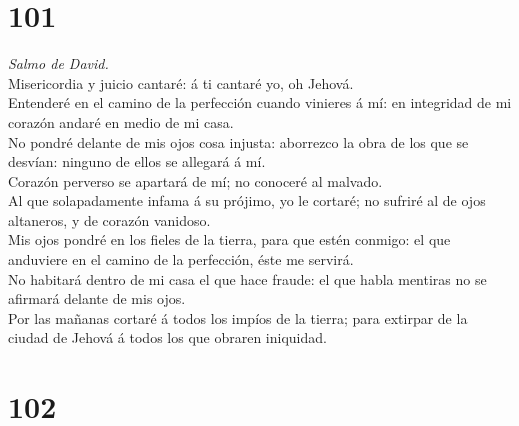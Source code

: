 \hypertarget{section-100}{%
\section{101}\label{section-100}}

 \emph{Salmo de David.}\\
Misericordia y juicio cantaré: á ti cantaré yo, oh Jehová.\\
 Entenderé en el camino de la perfección cuando vinieres á
mí: en integridad de mi corazón andaré en medio de mi casa.\\
 No pondré delante de mis ojos cosa injusta: aborrezco la
obra de los que se desvían: ninguno de ellos se allegará á mí.\\
 Corazón perverso se apartará de mí; no conoceré al
malvado.\\
 Al que solapadamente infama á su prójimo, yo le cortaré; no
sufriré al de ojos altaneros, y de corazón vanidoso.\\
 Mis ojos pondré en los fieles de la tierra, para que estén
conmigo: el que anduviere en el camino de la perfección, éste me
servirá.\\
 No habitará dentro de mi casa el que hace fraude: el que
habla mentiras no se afirmará delante de mis ojos.\\
 Por las mañanas cortaré á todos los impíos de la tierra;
para extirpar de la ciudad de Jehová á todos los que obraren iniquidad.

\hypertarget{section-101}{%
\section{102}\label{section-101}}

